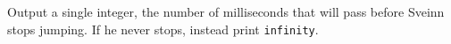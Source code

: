 
  Output a single integer, the number of milliseconds that
    will pass before Sveinn stops jumping. 
    If he never stops, instead print \texttt{infinity}.
